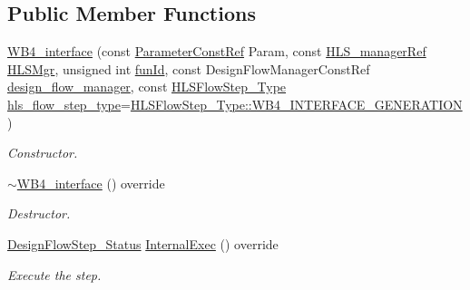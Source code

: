 \subsection*{Public Member Functions}
\begin{DoxyCompactItemize}
\item 
\hyperlink{classWB4__interface_a39e36195577d336179b46567f1d18941}{W\+B4\+\_\+interface} (const \hyperlink{Parameter_8hpp_a37841774a6fcb479b597fdf8955eb4ea}{Parameter\+Const\+Ref} Param, const \hyperlink{hls__manager_8hpp_acd3842b8589fe52c08fc0b2fcc813bfe}{H\+L\+S\+\_\+manager\+Ref} \hyperlink{classHLS__step_ade85003a99d34134418451ddc46a18e9}{H\+L\+S\+Mgr}, unsigned int \hyperlink{classHLSFunctionStep_a3e6434fd86c698b0c70520b859bff5b0}{fun\+Id}, const Design\+Flow\+Manager\+Const\+Ref \hyperlink{classDesignFlowStep_ab770677ddf087613add30024e16a5554}{design\+\_\+flow\+\_\+manager}, const \hyperlink{hls__step_8hpp_ada16bc22905016180e26fc7e39537f8d}{H\+L\+S\+Flow\+Step\+\_\+\+Type} \hyperlink{classHLS__step_aefd59af15346ec3f10bf12bd756e6777}{hls\+\_\+flow\+\_\+step\+\_\+type}=\hyperlink{hls__step_8hpp_ada16bc22905016180e26fc7e39537f8da753afa41e94e46c228dbc418b09406af}{H\+L\+S\+Flow\+Step\+\_\+\+Type\+::\+W\+B4\+\_\+\+I\+N\+T\+E\+R\+F\+A\+C\+E\+\_\+\+G\+E\+N\+E\+R\+A\+T\+I\+ON})
\begin{DoxyCompactList}\small\item\em Constructor. \end{DoxyCompactList}\item 
\hyperlink{classWB4__interface_a9901f252cb1d4d731b7b66a8be586e6c}{$\sim$\+W\+B4\+\_\+interface} () override
\begin{DoxyCompactList}\small\item\em Destructor. \end{DoxyCompactList}\item 
\hyperlink{design__flow__step_8hpp_afb1f0d73069c26076b8d31dbc8ebecdf}{Design\+Flow\+Step\+\_\+\+Status} \hyperlink{classWB4__interface_ad041a3291160ebf2a0c852ac9ff70a5e}{Internal\+Exec} () override
\begin{DoxyCompactList}\small\item\em Execute the step. \end{DoxyCompactList}\end{DoxyCompactItemize}

